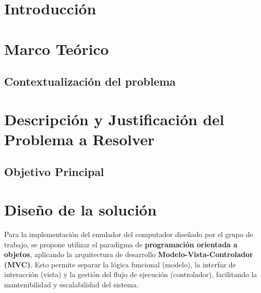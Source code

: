 \documentclass{article}
\begin{document}
\section{Introducción}\label{sec:intr}


\section{Marco Teórico}\label{sec:marc}

\subsection{Contextualización del problema}



\section{Descripción y Justificación del Problema a Resolver}\label{sec:descr}


\subsection{Objetivo Principal}




\section{Diseño de la solución}\label{sec:dis}

Para la implementación del emulador del computador diseñado por el grupo de trabajo, se propone 
utilizar el paradigma de \textbf{programación orientada a objetos}, aplicando la arquitectura de 
desarrollo \textbf{Modelo-Vista-Controlador (MVC)}. Esto permite separar la lógica funcional 
(modelo), la interfaz de interacción (vista) y la gestión del flujo de ejecución (controlador), 
facilitando la mantenibilidad y escalabilidad del sistema.
\end{document}
